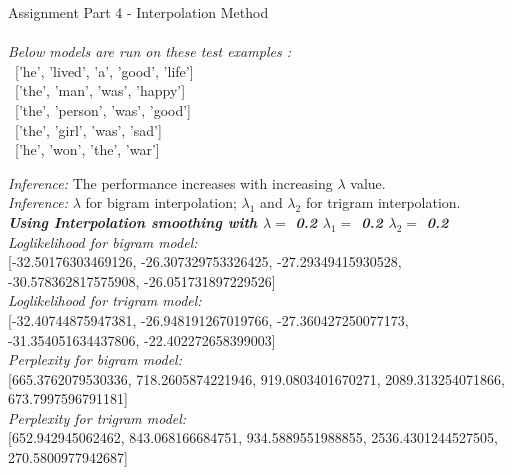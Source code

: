 \documentclass[11ppt]{article}
\begin{document}
\vspace{4mm}
{\rmfamily\mdseries\Large Assignment Part 4 - Interpolation Method}\\
\hrulefill \\
\vspace{3mm}
\textit{Below models are run on these test examples :} \\ 
\ ['he', 'lived', 'a', 'good', 'life'] \\
\ ['the', 'man', 'was', 'happy'] \\
\ ['the', 'person', 'was', 'good'] \\
\ ['the', 'girl', 'was', 'sad'] \\
\ ['he', 'won', 'the', 'war'] \\
\vspace{2mm}

\textit{Inference: }The performance increases with increasing $\lambda$ value.\\
\textit{Inference: } $\lambda$ for bigram interpolation; $\lambda_{1}$ and $\lambda_{2}$ for trigram interpolation.\\
\vspace{2mm}
\textit{\textbf{Using Interpolation smoothing with $\lambda = $ 0.2 $\lambda_{1} = $ 0.2 $\lambda_{2} = $ 0.2}} \\ \vspace{2mm}
\textit{Loglikelihood for bigram model:} \\ \vspace{1mm}  [-32.50176303469126, -26.307329753326425, -27.29349415930528, -30.578362817575908, -26.051731897229526]  \\ \vspace{2mm}
\textit{Loglikelihood for trigram model:} \\ \vspace{1mm}  [-32.40744875947381, -26.948191267019766, -27.360427250077173, -31.354051634437806, -22.402272658399003]  \\ \vspace{2mm}
\textit{Perplexity for bigram model:} \\ \vspace{1mm}  [665.3762079530336, 718.2605874221946, 919.0803401670271, 2089.313254071866, 673.7997596791181]  \\ \vspace{2mm}
\textit{Perplexity for trigram model:} \\ \vspace{1mm}  [652.942945062462, 843.068166684751, 934.5889551988855, 2536.4301244527505, 270.5800977942687]  \\ \vspace{2mm}
\end{document}
